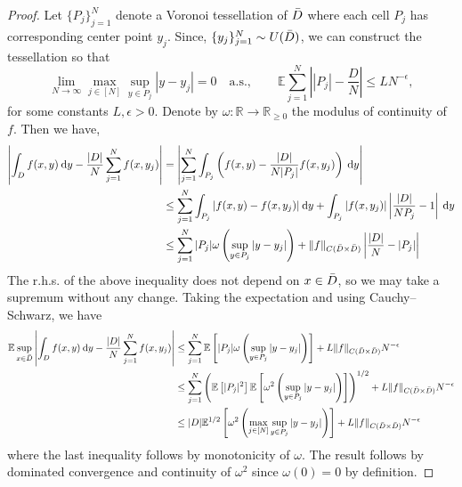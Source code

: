 \documentclass[10pt,a4paper]{amsart}
\newcommand{\E}{\mathbb{E}}
\newcommand{\R}{\mathbbm{R}}
\providecommand{\mathbbm}{\mathbb} %
\begin{document}
\begin{proof}
Let \(\{P_j\}_{j=1}^N\) denote a Voronoi tessellation of \(\Bar{D}\) where each cell \(P_j\) has corresponding center point \(y_j\).
Since, \(\{y_j\}_{j=1}^N \sim U(\Bar{D})\), we can construct the tessellation so that
\[\lim_{N \to \infty} \max_{j \in [N]} \sup_{y \in P_j} |y - y_j| = 0 \quad \text{a.s.}, \qquad \E \sum_{j=1}^N \left | |P_j| - \frac{D}{N} \right | \leq L N^{-\epsilon},\]
for some constants \(L, \epsilon > 0\).
Denote by \(\omega : \R \to \R_{\geq 0}\) the modulus of continuity of \(f\). Then we have,
\begin{align*}
\left | \int_D f(x,y) \: \mathrm{d}y - \frac{|D|}{N} \sum_{j=1}^N f(x,y_j) \right | &= \left | \sum_{j=1}^N \int_{P_j} \left ( f(x,y) - \frac{|D|}{N|P_j|} f(x,y_j) \right ) \: \mathrm{d}y \right | \\
&\leq \sum_{j=1}^N \int_{P_j} |f(x,y) - f(x,y_j)| \: \mathrm{d}y + \int_{P_j} |f(x,y_j)|  \left | \frac{|D|}{N P_j} - 1 \right | \: \mathrm{d}y \\
&\leq \sum_{j=1}^N |P_j| \omega \left( \sup_{y \in P_j} |y-y_j| \right ) + \|f\|_{C(\Bar{D} \times \Bar{D})} \left | \frac{|D|}{N} - |P_j| \right | 
\end{align*}
The r.h.s. of the above inequality does not depend on \(x \in \Bar{D}\), so we may take a supremum without any change.
Taking the expectation and using Cauchy–Schwarz, we have
\begin{align*}
\E \sup_{x \in \Bar{D}} \left | \int_D f(x,y) \: \mathrm{d}y - \frac{|D|}{N} \sum_{j=1}^N f(x,y_j) \right | &\leq \sum_{j=1}^N \E \left [ |P_j| \omega \left( \sup_{y \in P_j} |y-y_j| \right ) \right ] + L \|f\|_{C(\Bar{D} \times \Bar{D})} N^{-\epsilon} \\
&\leq \sum_{j=1}^N \left ( \E \left [ |P_j|^2 \right ] \E \left [ \omega^2 \left( \sup_{y \in P_j} |y-y_j| \right )  \right ] \right  )^{1/2} + L \|f\|_{C(\Bar{D} \times \Bar{D})} N^{-\epsilon}  \\
&\leq |D| \E^{1/2} \left [ \omega^2 \left( \max_{j \in [N]}\sup_{y \in P_j} |y-y_j| \right )  \right ] + L \|f\|_{C(\Bar{D} \times \Bar{D})} N^{-\epsilon} 
\end{align*}
where the last inequality follows by monotonicity of \(\omega\).
The result follows by dominated convergence and continuity of \(\omega^2\) since \(\omega(0)=0\) by definition.
\end{proof}
\end{document}
